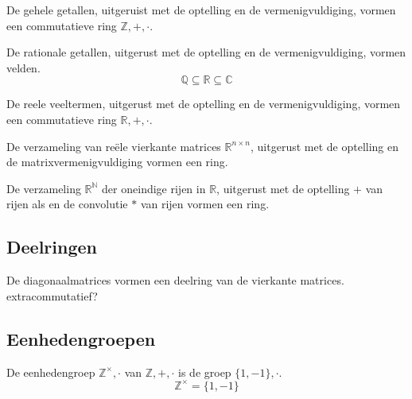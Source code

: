 \documentclass[main.tex]{subfiles}
\begin{document}
\begin{vb}
  De gehele getallen, uitgeruist met de optelling en de vermenigvuldiging, vormen een commutatieve ring $\mathbb{Z},+,\cdot$.
  \commj
\end{vb}

\begin{vb}
  De rationale getallen, uitgerust met de optelling en de vermenigvuldiging, vormen velden.
  \[ \mathbb{Q} \subseteq \mathbb{R} \subseteq \mathbb{C} \]
  \commj
\end{vb}

\begin{vb}
  De reele veeltermen, uitgerust met de optelling en de vermenigvuldiging, vormen een commutatieve ring $\mathbb{R},+,\cdot$.\\
  \commj
\end{vb}

\begin{vb}
  De verzameling van re\"ele vierkante matrices $\mathbb{R}^{n\times n}$, uitgerust met de optelling en de matrixvermenigvuldiging vormen een ring. 
\end{vb}

\begin{vb}
  De verzameling $\mathbb{R}^{\mathbb{N}}$ der oneindige rijen in $\mathbb{R}$, uitgerust met de optelling $+$ van rijen als en de convolutie $*$ van rijen vormen een ring.\\
  \commj
\end{vb}

\subsection{Deelringen}
\label{sec:deelringen}

\begin{vb}
  De diagonaalmatrices vormen een deelring van de vierkante matrices.
  extra{commutatief?}
\end{vb}



\subsection{Eenhedengroepen}
\label{sec:eenhedengroepen}

\begin{vb}
  De eenhedengroep $\mathbb{Z}^{\times},\cdot$ van $\mathbb{Z},+,\cdot$ is de groep $\{1,-1\},\cdot$.
  \[ \mathbb{Z}^{\times} = \{1,-1\}\]
\end{vb}
\end{document}
